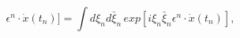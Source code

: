\begin{equation}
\epsilon^n\cdot \dot{x}(t_n)]=\int d\xi_nd\bar{\xi}_n\,exp[i\xi_n\bar{\xi}_n\epsilon^n
\cdot \dot{x}(t_n)],
\end{equation}

